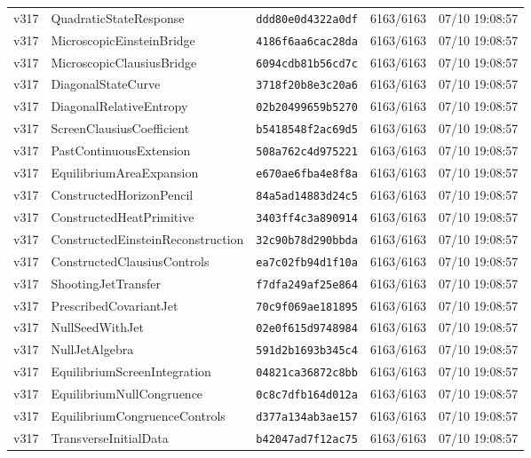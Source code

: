 \documentclass[11pt]{article}
\theoremstyle{definition}\newtheorem{deriv}{Derivação}
\begin{document}
{\begin{longtable}{@{}lllll@{}}
v317 & QuadraticStateResponse & \texttt{ddd80e0d4322a0df} & 6163/6163 & 07/10 19:08:57 \\
v317 & MicroscopicEinsteinBridge & \texttt{4186f6aa6cac28da} & 6163/6163 & 07/10 19:08:57 \\
v317 & MicroscopicClausiusBridge & \texttt{6094cdb81b56cd7c} & 6163/6163 & 07/10 19:08:57 \\
v317 & DiagonalStateCurve & \texttt{3718f20b8e3c20a6} & 6163/6163 & 07/10 19:08:57 \\
v317 & DiagonalRelativeEntropy & \texttt{02b20499659b5270} & 6163/6163 & 07/10 19:08:57 \\
v317 & ScreenClausiusCoefficient & \texttt{b5418548f2ac69d5} & 6163/6163 & 07/10 19:08:57 \\
v317 & PastContinuousExtension & \texttt{508a762c4d975221} & 6163/6163 & 07/10 19:08:57 \\
v317 & EquilibriumAreaExpansion & \texttt{e670ae6fba4e8f8a} & 6163/6163 & 07/10 19:08:57 \\
v317 & ConstructedHorizonPencil & \texttt{84a5ad14883d24c5} & 6163/6163 & 07/10 19:08:57 \\
v317 & ConstructedHeatPrimitive & \texttt{3403ff4c3a890914} & 6163/6163 & 07/10 19:08:57 \\
v317 & ConstructedEinsteinReconstruction & \texttt{32c90b78d290bbda} & 6163/6163 & 07/10 19:08:57 \\
v317 & ConstructedClausiusControls & \texttt{ea7c02fb94d1f10a} & 6163/6163 & 07/10 19:08:57 \\
v317 & ShootingJetTransfer & \texttt{f7dfa249af25e864} & 6163/6163 & 07/10 19:08:57 \\
v317 & PrescribedCovariantJet & \texttt{70c9f069ae181895} & 6163/6163 & 07/10 19:08:57 \\
v317 & NullSeedWithJet & \texttt{02e0f615d9748984} & 6163/6163 & 07/10 19:08:57 \\
v317 & NullJetAlgebra & \texttt{591d2b1693b345c4} & 6163/6163 & 07/10 19:08:57 \\
v317 & EquilibriumScreenIntegration & \texttt{04821ca36872c8bb} & 6163/6163 & 07/10 19:08:57 \\
v317 & EquilibriumNullCongruence & \texttt{0c8c7dfb164d012a} & 6163/6163 & 07/10 19:08:57 \\
v317 & EquilibriumCongruenceControls & \texttt{d377a134ab3ae157} & 6163/6163 & 07/10 19:08:57 \\
v317 & TransverseInitialData & \texttt{b42047ad7f12ac75} & 6163/6163 & 07/10 19:08:57 \\

\end{longtable}}
\end{document}
